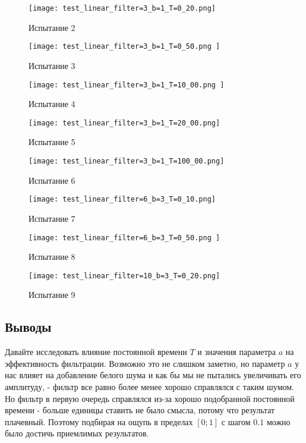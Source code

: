 \begin{figure}[ht]
    \centering
    \texttt{[image: test\_linear\_filter=3\_b=1\_T=0\_20.png]}
	\caption{Испытание 2}
\end{figure}

\begin{figure}[ht]
    \centering
    \texttt{[image: test\_linear\_filter=3\_b=1\_T=0\_50.png ]}
	\caption{Испытание 3}
\end{figure}
\newpage
\begin{figure}[ht]
    \centering
    \texttt{[image: test\_linear\_filter=3\_b=1\_T=10\_00.png ]}
	\caption{Испытание 4}
\end{figure}

\begin{figure}[ht]
    \centering
    \texttt{[image: test\_linear\_filter=3\_b=1\_T=20\_00.png]}
	\caption{Испытание 5}
\end{figure}
\newpage
\begin{figure}[ht]
    \centering
    \texttt{[image: test\_linear\_filter=3\_b=1\_T=100\_00.png]}
	\caption{Испытание 6}
\end{figure}

\begin{figure}[ht]
    \centering
    \texttt{[image: test\_linear\_filter=6\_b=3\_T=0\_10.png]}
	\caption{Испытание 7}
\end{figure}
\newpage
\begin{figure}[ht]
    \centering
    \texttt{[image: test\_linear\_filter=6\_b=3\_T=0\_50.png ]}
	\caption{Испытание 8}
\end{figure}

\begin{figure}[ht]
    \centering
    \texttt{[image: test\_linear\_filter=10\_b=3\_T=0\_20.png]}
	\caption{Испытание 9}
\end{figure}


\newpage
\subsection{Выводы}
Давайте исследовать влияние постоянной времени $T$ и значения параметра $a$ на эффективность фильтрации. Возможно это не слишком заметно, но параметр $a$ у нас влияет на добавление белого шума и как бы мы не пытались увеличивать его амплитуду, - фильтр все равно более менее хорошо справлялся с таким шумом.
Но фильтр в первую очередь справлялся из-за хорошо подобранной постоянной времени - больше единицы ставить не было смысла, потому что результат плачевный. Поэтому подбирая на ощупь в пределах $[0 ; 1]$ с шагом $0.1$ можно было достичь приемлимых результатов.




